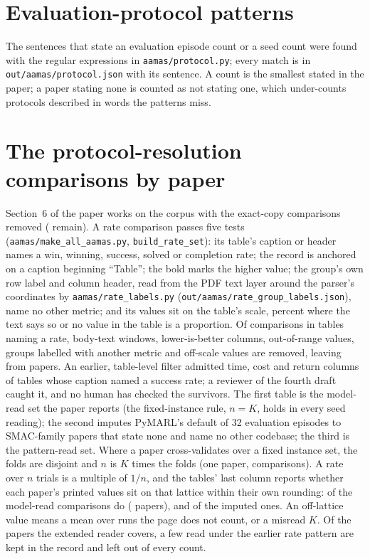 \documentclass[sigconf,anonymous]{aamas}
\begin{document}
\section{Evaluation-protocol patterns}
\label{app:patterns}
The sentences that state an evaluation episode count or a seed count were
found with the regular expressions in \texttt{aamas/protocol.py}; every match
is in \texttt{out/aamas/protocol.json} with its sentence. A count is the
smallest stated in the paper; a paper stating none is counted as not stating
one, which under-counts protocols described in words the patterns miss.

\section{The protocol-resolution comparisons by paper}
\label{app:protocol-papers}
Section~6 of the paper works on the corpus with the \nSixdedupRemoved{}
exact-copy comparisons removed (\nSixdedupN{} remain). A rate comparison
passes five tests (\texttt{aamas/make\_all\_aamas.py}, \texttt{build\_rate\_set}):
its table's caption or header names a win, winning, success, solved or
completion rate; the record is anchored on a caption beginning ``Table'';
the bold marks the higher value; the group's own row label and column
header, read from the PDF text layer around the parser's coordinates by
\texttt{aamas/rate\_labels.py} (\texttt{out/aamas/rate\_group\_labels.json}),
name no other metric; and its values sit on the table's scale, percent
where the text says so or no value in the table is a proportion. Of
\nRfTableNamesARate{} comparisons in tables naming a rate,
\nRfNotAnchoredOnACaption{} body-text windows, \nRfLowerIsBetter{}
lower-is-better columns, \nRfOutOfRange{} out-of-range values,
\nRfGroupLabelNamesAnotherMetric{} groups labelled with another metric
and \nRfOffTheTableScale{} off-scale values are removed, leaving
\nRfKept{} from \nRfKeptPapers{} papers. An earlier, table-level filter
admitted time, cost and return columns of tables whose caption named a
success rate; a reviewer of the fourth draft caught it, and no human has
checked the survivors. The first table is the model-read set the paper
reports (the fixed-instance rule, $n = K$, holds in every seed reading);
the second imputes PyMARL's default of 32 evaluation episodes to
SMAC-family papers that state none and name no other codebase; the third
is the pattern-read set. Where a paper cross-validates over a fixed
instance set, the folds are disjoint and $n$ is $K$ times the folds
(one paper, \nPtwoResTypedCvFolds{} comparisons). A rate over $n$ trials
is a multiple of $1/n$, and the tables' last column reports whether each
paper's printed values sit on that lattice within their own rounding:
\nPtwoResTypedLatticeConsistent{} of the \nPtwoResTypedN{} model-read
comparisons do (\nPtwoResTypedLatticeConsistentPapers{} papers), and
\nPtwoResInheritedLatticeConsistent{} of the \nPtwoResInheritedN{}
imputed ones. An off-lattice value means a mean over runs the page does
not count, or a misread $K$.
Of the \nPtwoPapers{} papers the extended reader covers, a few read under
the earlier rate pattern are kept in the record and left out of every
count.



\end{document}
